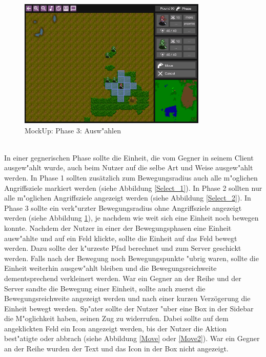 \documentclass[12pt, titlepage]{scrartcl}
\newcounter{subsubsubsection}[subsubsection]
\begin{document}
			        \begin{figure}[H] 
    				    \centering
    				    \includegraphics[width=0.8\textwidth]{images/mockUps/Select2.png}
    				    \caption{MockUp: Phase 3: Ausw"ahlen}
    				    \label{Select_3}
			        \end{figure} 
		            \ \\ In einer gegnerischen Phase sollte die Einheit, die vom Gegner in seinem Client ausgew"ahlt wurde, auch beim Nutzer auf die selbe Art und Weise ausgew"ahlt werden. In Phase 1 sollten zus\"atzlich zum Bewegungsradius auch alle m"oglichen Angriffsziele markiert werden (siehe Abbildung \ref{Select_1}). In Phase 2 sollten nur alle m"oglichen Angriffsziele angezeigt werden (siehe Abbildung \ref{Select_2}). In Phase 3 sollte ein verk"urzter Bewegungsradius ohne Angriffsziele angezeigt werden (siehe Abbildung \ref{Select_3}), je nachdem wie weit sich eine Einheit noch bewegen konnte.
                    Nachdem der Nutzer in einer der Bewegungsphasen eine Einheit ausw"ahlte und auf ein Feld klickte, sollte die Einheit auf das Feld bewegt werden. Dazu sollte der k"urzeste Pfad berechnet und zum Server geschickt werden. Falls nach der Bewegung noch Bewegungspunkte "ubrig waren, sollte die Einheit weiterhin ausgew"ahlt bleiben und die Bewegungsreichweite dementsprechend verkleinert werden. War ein Gegner an der Reihe und der Server sandte die Bewegung einer Einheit, sollte auch zuerst die Bewegungsreichweite angezeigt werden und nach einer kurzen Verz\"ogerung die Einheit bewegt werden. Sp"ater sollte der Nutzer "uber eine Box in der Sidebar die M"oglichkeit haben, seinen Zug zu widerrufen. Dabei sollte auf dem angeklickten Feld ein Icon angezeigt werden, bis der Nutzer die Aktion best"atigte oder abbrach (siehe Abbildung \ref{Move} oder \ref{Move2}). War ein Gegner an der Reihe wurden der Text und das Icon in der Box nicht angezeigt.
\end{document}
